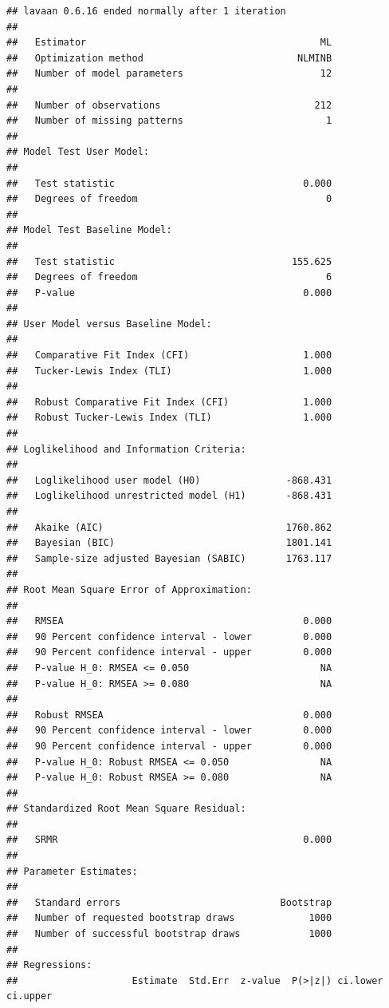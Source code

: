 \documentclass[
  11pt,
]{book}
\begin{document}
\begin{verbatim}
## lavaan 0.6.16 ended normally after 1 iteration
## 
##   Estimator                                         ML
##   Optimization method                           NLMINB
##   Number of model parameters                        12
## 
##   Number of observations                           212
##   Number of missing patterns                         1
## 
## Model Test User Model:
##                                                       
##   Test statistic                                 0.000
##   Degrees of freedom                                 0
## 
## Model Test Baseline Model:
## 
##   Test statistic                               155.625
##   Degrees of freedom                                 6
##   P-value                                        0.000
## 
## User Model versus Baseline Model:
## 
##   Comparative Fit Index (CFI)                    1.000
##   Tucker-Lewis Index (TLI)                       1.000
##                                                       
##   Robust Comparative Fit Index (CFI)             1.000
##   Robust Tucker-Lewis Index (TLI)                1.000
## 
## Loglikelihood and Information Criteria:
## 
##   Loglikelihood user model (H0)               -868.431
##   Loglikelihood unrestricted model (H1)       -868.431
##                                                       
##   Akaike (AIC)                                1760.862
##   Bayesian (BIC)                              1801.141
##   Sample-size adjusted Bayesian (SABIC)       1763.117
## 
## Root Mean Square Error of Approximation:
## 
##   RMSEA                                          0.000
##   90 Percent confidence interval - lower         0.000
##   90 Percent confidence interval - upper         0.000
##   P-value H_0: RMSEA <= 0.050                       NA
##   P-value H_0: RMSEA >= 0.080                       NA
##                                                       
##   Robust RMSEA                                   0.000
##   90 Percent confidence interval - lower         0.000
##   90 Percent confidence interval - upper         0.000
##   P-value H_0: Robust RMSEA <= 0.050                NA
##   P-value H_0: Robust RMSEA >= 0.080                NA
## 
## Standardized Root Mean Square Residual:
## 
##   SRMR                                           0.000
## 
## Parameter Estimates:
## 
##   Standard errors                            Bootstrap
##   Number of requested bootstrap draws             1000
##   Number of successful bootstrap draws            1000
## 
## Regressions:
##                    Estimate  Std.Err  z-value  P(>|z|) ci.lower ci.upper

\end{verbatim}
\end{document}
